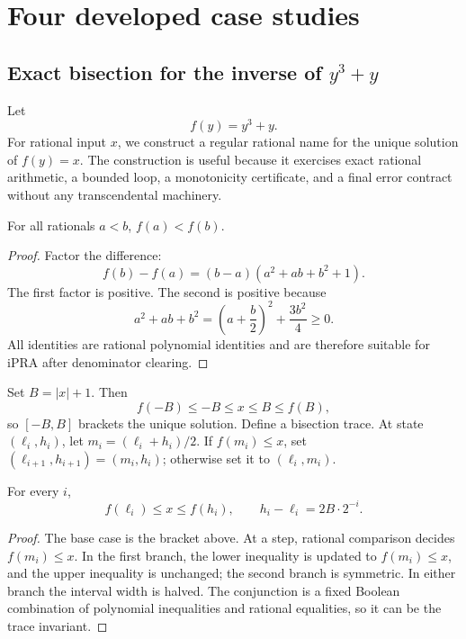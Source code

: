 \section{Four developed case studies}
\label{sec:casestudies}

\subsection{Exact bisection for the inverse of \texorpdfstring{$y^3+y$}{y3+y}}

Let
\[
        f(y)=y^3+y.
\]
For rational input \(x\), we construct a regular rational name for the unique
solution of \(f(y)=x\).  The construction is useful because it exercises exact
rational arithmetic, a bounded loop, a monotonicity certificate, and a final
error contract without any transcendental machinery.

\begin{lemma}
For all rationals \(a<b\), \(f(a)<f(b)\).
\end{lemma}

\begin{proof}
Factor the difference:
\[
 f(b)-f(a)
 =(b-a)(a^2+ab+b^2+1).
\]
The first factor is positive.  The second is positive because
\[
 a^2+ab+b^2=\left(a+\frac b2\right)^2+\frac{3b^2}{4}\ge0.
\]
All identities are rational polynomial identities and are therefore suitable
for iPRA after denominator clearing.
\end{proof}

Set \(B=|x|+1\).  Then
\[
        f(-B)\le -B\le x\le B\le f(B),
\]
so \([-B,B]\) brackets the unique solution.  Define a bisection trace.  At
state \((\ell_i,h_i)\), let \(m_i=(\ell_i+h_i)/2\).  If
\(f(m_i)\le x\), set \((\ell_{i+1},h_{i+1})=(m_i,h_i)\); otherwise set it to
\((\ell_i,m_i)\).

\begin{lemma}
For every \(i\),
\[
 f(\ell_i)\le x\le f(h_i),
 \qquad
 h_i-\ell_i=2B\cdot2^{-i}.
\]
\end{lemma}

\begin{proof}
The base case is the bracket above.  At a step, rational comparison decides
\(f(m_i)\le x\).  In the first branch, the lower inequality is updated to
\(f(m_i)\le x\), and the upper inequality is unchanged; the second branch is
symmetric.  In either branch the interval width is halved.  The conjunction is
a fixed Boolean combination of polynomial inequalities and rational equalities,
so it can be the trace invariant.
\end{proof}

